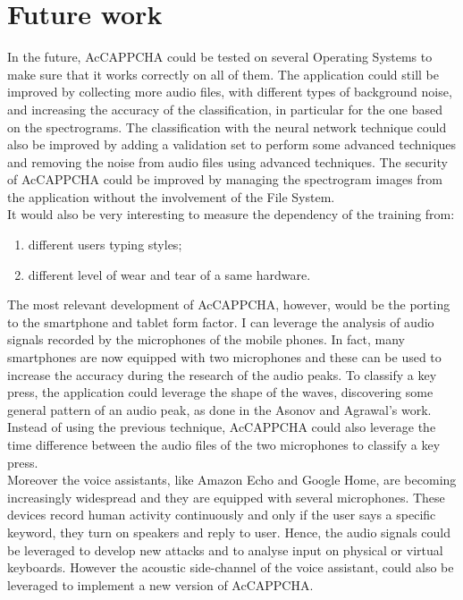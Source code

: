 \chapter{Future work}\label{chapter:Future}
In the future, AcCAPPCHA could be tested on several Operating Systems to make sure that it works correctly on all of them. The application could still be improved by collecting more audio files, with different types of background noise, and increasing the accuracy of the classification, in particular for the one based on the spectrograms. The classification with the neural network technique could also be improved by adding a validation set to perform some advanced techniques and removing the noise from audio files using advanced techniques. The security of AcCAPPCHA could be improved by managing the spectrogram images from the application without the involvement of the File System.\\
It would also be very interesting to measure the dependency of the training from:
\begin{enumerate}
\item{different users typing styles;}
\item{different level of wear and tear of a same hardware.}
\end{enumerate}
The most relevant development of AcCAPPCHA, however, would be the porting to the smartphone and tablet form factor. I can leverage the analysis of audio signals recorded by the microphones of the mobile phones. In fact, many smartphones are now equipped with two microphones and these can be used to increase the accuracy during the research of the audio peaks. To classify a key press, the application could leverage the shape of the waves, discovering some general pattern of an audio peak, as done in the Asonov and Agrawal's work\cite{keyboard_acoustic}. Instead of using the previous technique, AcCAPPCHA could also leverage the time difference between the audio files of the two microphones to classify a key press\cite{smartphone_acoustic}.\\
Moreover the voice assistants, like Amazon Echo and Google Home, are becoming increasingly widespread and they are equipped with several microphones. These devices record human activity continuously and only if the user says a specific keyword, they turn on speakers and reply to user. Hence, the audio signals could be leveraged to develop new attacks and to analyse input on physical or virtual keyboards\cite{voice_assistant}. However the acoustic side-channel of the voice assistant, could also be leveraged to implement a new version of AcCAPPCHA.\\
